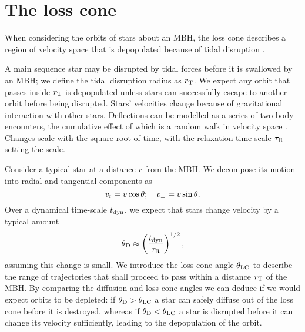 \chapter{The loss cone}\label{ap:loss-cone}

When considering the orbits of stars about an MBH, the loss cone describes a region of velocity space that is depopulated because of tidal disruption \citep{Frank1976,Lightman1977,Merritt2013}.

A main sequence star may be disrupted by tidal forces before it is swallowed by an MBH; we define the tidal disruption radius as $r_\mathrm{T}$. We expect any orbit that passes inside $r_\mathrm{T}$ is depopulated unless stars can successfully escape to another orbit before being disrupted. Stars' velocities change because of gravitational interaction with other stars. Deflections can be modelled as a series of two-body encounters, the cumulative effect of which is a random walk in velocity space \citep[chapter 2]{Chandrasekhar1960}. Changes scale with the square-root of time, with the relaxation time-scale $\tau_\mathrm{R}$ setting the scale.

Consider a typical star at a distance $r$ from the MBH. We decompose its motion into radial and tangential components as
\begin{equation}
v_\mathrm{r} = v\cos \theta; \quad v_\perp = v\sin \theta.
\end{equation}
Over a dynamical time-scale $t_\mathrm{dyn}$, we expect that stars change velocity by a typical amount
\begin{equation}
\theta_\mathrm{D} \approx \left(\dfrac{t_\mathrm{dyn}}{\tau_\mathrm{R}}\right)^{1/2},
\end{equation}
assuming this change is small. We introduce the loss cone angle $\theta_\mathrm{LC}$ to describe the range of trajectories that shall proceed to pass within a distance $r_\mathrm{T}$ of the MBH. By comparing the diffusion and loss cone angles we can deduce if we would expect orbits to be depleted: if $\theta_\mathrm{D} > \theta_\mathrm{LC}$ a star can safely diffuse out of the loss cone before it is destroyed, whereas if $\theta_\mathrm{D} < \theta_\mathrm{LC}$ a star is disrupted before it can change its velocity sufficiently, leading to the depopulation of the orbit.

